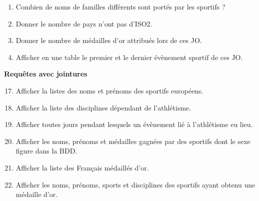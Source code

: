 \documentclass[10pt,cours,a4paper,firamath]{nsi}
\begin{document}
\begin{exercice}[ : JO]
\begin{enumerate}
              
        \item Combien de noms de familles différents sont portés par les sportifs ?
        \item Donner le nombre de pays n'ont pas d'ISO2.
        \item Donner le nombre de médailles d'or attribués lors de ces JO.
        \item Afficher en une table le premier et le dernier évènement sportif	de ces JO.\\
    \end{enumerate}
    \textbf{Requêtes avec jointures}
    \begin{enumerate}
        \setcounter{enumi}{16}
        \item Afficher la listes des noms et prénoms des sportifs européens.
        \item Afficher la liste des disciplines dépendant de l'athlétisme.
        \item Afficher toutes jours pendant lesquels un évènement lié à l'athlétisme eu lieu.
        \item Afficher les noms, prénoms et médailles gagnées par des sportifs dont le sexe figure dans la BDD.
        \item Afficher la liste des Français médaillés d'or.
        \item Afficher les noms, prénoms, sports et disciplines des sportifs ayant obtenu une médaille d'or.
    \end{enumerate}
    
\end{exercice}
\end{document}
